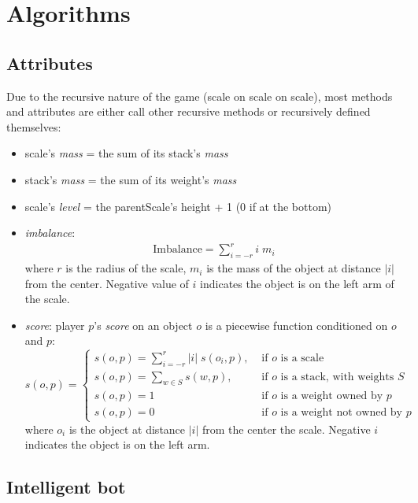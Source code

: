 \documentclass[12pt]{article}
\begin{document}
\section{Algorithms}
\subsection{Attributes}
Due to the recursive nature of the game (scale on scale on scale), most methods
and attributes are either call other recursive methods or recursively defined
themselves:
\begin{itemize}
  \item scale's \textit{mass} = the sum of its stack's \textit{mass}
  \item stack's \textit{mass} = the sum of its weight's \textit{mass}
  \item scale's \textit{level} = the parentScale's height +
    1 (0 if at the bottom)
  \item \textit{imbalance}: 
    \begin{align*}
      \text{Imbalance} = \sum_{i=-r}^{r}i\;m_i
    \end{align*}
    where $r$ is the radius of the scale, $m_i$ is the mass of the object at
    distance $|i|$ from the center. Negative value of $i$ indicates the object
    is on the left arm of the scale.
  \item \textit{score}: player $p$'s \textit{score} on an object $o$ is a
    piecewise function conditioned on $o$ and $p$:
    \begin{equation*}
      s(o,p) = \begin{cases}
        s(o, p) = \sum_{i=-r}^{r} |i|\;s(o_i, p) , &\text{ if $o$ is a scale}\\
        s(o, p) = \sum_{w\in S} s(w, p) , &\text{ if $o$ is a stack, with
        weights $S$}\\
        s(o, p) = 1 &\text{ if $o$ is a weight owned by $p$}\\
        s(o, p) = 0 &\text{ if $o$ is a weight not owned by $p$}
      \end{cases}
    \end{equation*}
    where $o_i$ is the object at distance $|i|$ from the center the scale.
    Negative $i$ indicates the object is on the left arm.
\end{itemize}
\subsection{Intelligent bot}
\end{document}
